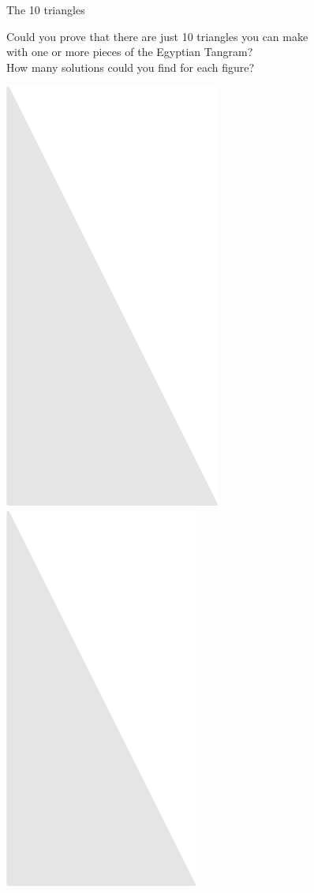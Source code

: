 \documentclass[14pt]{beamer}
\begin{document}
    \begin{frame}{The 10 triangles}

        \vspace{-0.5em}
        \begin{center}
            {\small Could you prove that there are just 10 triangles you can make\\with one or more pieces of the Egyptian Tangram?\\How many solutions could you find for each figure?}

            \bigskip\bigskip

            \includegraphics[scale=0.3]{figures/figure024f.pdf}\quad
            \includegraphics[scale=0.3]{figures/figure024e.pdf}\quad

\end{center}
\end{frame}
\end{document}
